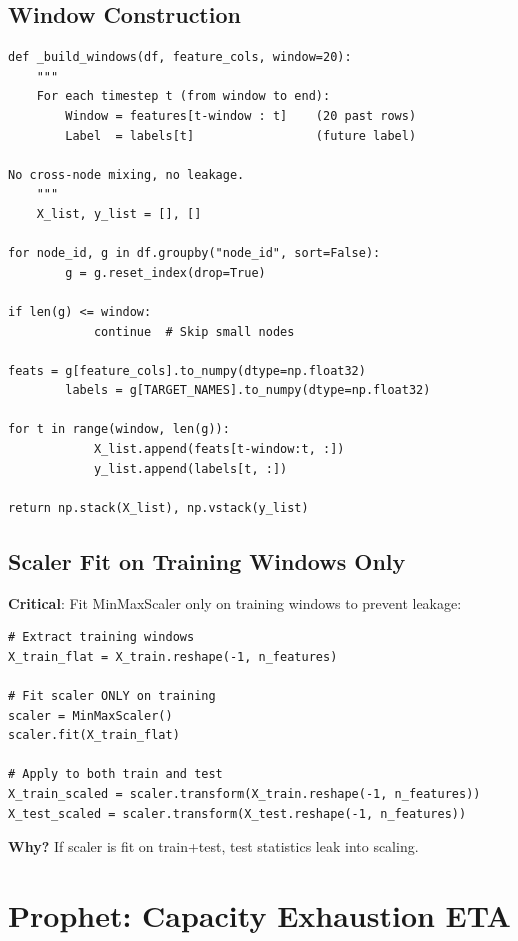 \documentclass[11pt,a4paper,oneside]{report}
\begin{document}
\subsection{Window Construction}

\begin{lstlisting}
def _build_windows(df, feature_cols, window=20):
    """
    For each timestep t (from window to end):
        Window = features[t-window : t]    (20 past rows)
        Label  = labels[t]                 (future label)

No cross-node mixing, no leakage.
    """
    X_list, y_list = [], []

for node_id, g in df.groupby("node_id", sort=False):
        g = g.reset_index(drop=True)

if len(g) <= window:
            continue  # Skip small nodes

feats = g[feature_cols].to_numpy(dtype=np.float32)
        labels = g[TARGET_NAMES].to_numpy(dtype=np.float32)

for t in range(window, len(g)):
            X_list.append(feats[t-window:t, :])
            y_list.append(labels[t, :])

return np.stack(X_list), np.vstack(y_list)
\end{lstlisting}

\subsection{Scaler Fit on Training Windows Only}

\textbf{Critical}: Fit MinMaxScaler only on training windows to prevent leakage:

\begin{lstlisting}
# Extract training windows
X_train_flat = X_train.reshape(-1, n_features)

# Fit scaler ONLY on training
scaler = MinMaxScaler()
scaler.fit(X_train_flat)

# Apply to both train and test
X_train_scaled = scaler.transform(X_train.reshape(-1, n_features))
X_test_scaled = scaler.transform(X_test.reshape(-1, n_features))
\end{lstlisting}

\textbf{Why?} If scaler is fit on train+test, test statistics leak into scaling.

\section{Prophet: Capacity Exhaustion ETA}
\end{document}
